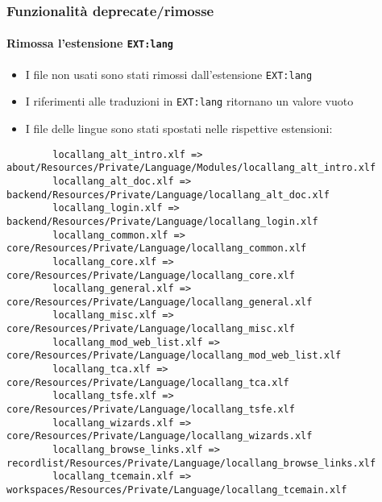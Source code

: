 
\begin{frame}[fragile]
	\frametitle{Funzionalità deprecate/rimosse}
	\framesubtitle{Rimossa l'estensione \texttt{EXT:lang}}

	\lstset{basicstyle=\tiny\ttfamily}

	\begin{itemize}
		\item I file non usati sono stati rimossi dall'estensione \texttt{EXT:lang}
		\item I riferimenti alle traduzioni in \texttt{EXT:lang} ritornano un valore vuoto
		\item I file delle lingue sono stati spostati nelle rispettive estensioni:
	\end{itemize}

	\begin{lstlisting}
		locallang_alt_intro.xlf => about/Resources/Private/Language/Modules/locallang_alt_intro.xlf
		locallang_alt_doc.xlf => backend/Resources/Private/Language/locallang_alt_doc.xlf
		locallang_login.xlf => backend/Resources/Private/Language/locallang_login.xlf
		locallang_common.xlf => core/Resources/Private/Language/locallang_common.xlf
		locallang_core.xlf => core/Resources/Private/Language/locallang_core.xlf
		locallang_general.xlf => core/Resources/Private/Language/locallang_general.xlf
		locallang_misc.xlf => core/Resources/Private/Language/locallang_misc.xlf
		locallang_mod_web_list.xlf => core/Resources/Private/Language/locallang_mod_web_list.xlf
		locallang_tca.xlf => core/Resources/Private/Language/locallang_tca.xlf
		locallang_tsfe.xlf => core/Resources/Private/Language/locallang_tsfe.xlf
		locallang_wizards.xlf => core/Resources/Private/Language/locallang_wizards.xlf
		locallang_browse_links.xlf => recordlist/Resources/Private/Language/locallang_browse_links.xlf
		locallang_tcemain.xlf => workspaces/Resources/Private/Language/locallang_tcemain.xlf
	\end{lstlisting}

\end{frame}

